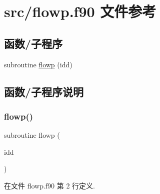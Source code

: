 \hypertarget{flowp_8f90}{}\section{src/flowp.f90 文件参考}
\label{flowp_8f90}
\subsection*{函数/子程序}
\begin{DoxyCompactItemize}
\item 
subroutine \mbox{\hyperlink{flowp_8f90_a72c3c47ffa6b5d9a1ae4cccfdf77e35a}{flowp}} (idd)
\end{DoxyCompactItemize}


\subsection{函数/子程序说明}
\mbox{\label{flowp_8f90_a72c3c47ffa6b5d9a1ae4cccfdf77e35a}} 
\subsubsection{\texorpdfstring{flowp()}{flowp()}}
{\footnotesize\ttfamily subroutine flowp (\begin{DoxyParamCaption}\item[{}]{idd }\end{DoxyParamCaption})}



在文件 flowp.\+f90 第 2 行定义.

